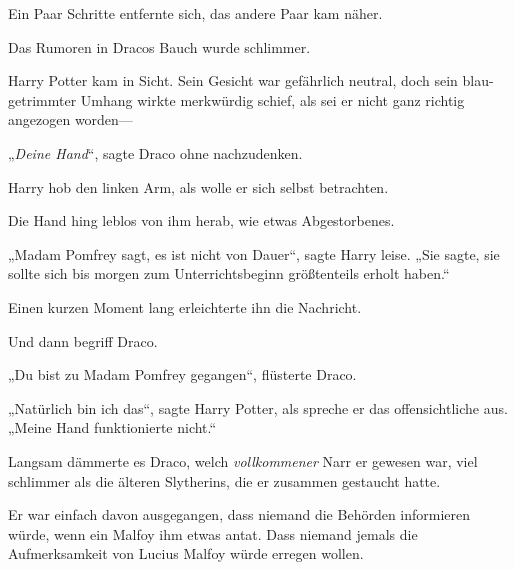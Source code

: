 Ein Paar Schritte entfernte sich, das andere Paar kam näher.

Das Rumoren in Dracos Bauch wurde schlimmer.

Harry Potter kam in Sicht. Sein Gesicht war gefährlich neutral, doch sein blau-getrimmter Umhang wirkte merkwürdig schief, als sei er nicht ganz richtig angezogen worden—

„\emph{Deine Hand}“, sagte Draco ohne nachzudenken.

Harry hob den linken Arm, als wolle er sich selbst betrachten.

Die Hand hing leblos von ihm herab, wie etwas Abgestorbenes.

„Madam Pomfrey sagt, es ist nicht von Dauer“, sagte Harry leise. „Sie sagte, sie sollte sich bis morgen zum Unterrichtsbeginn größtenteils erholt haben.“

Einen kurzen Moment lang erleichterte ihn die Nachricht.

Und dann begriff Draco.

„Du bist zu Madam Pomfrey gegangen“, flüsterte Draco.

„Natürlich bin ich das“, sagte Harry Potter, als spreche er das offensichtliche aus. „Meine Hand funktionierte nicht.“

Langsam dämmerte es Draco, welch \emph{vollkommener} Narr er gewesen war, viel schlimmer als die älteren Slytherins, die er zusammen gestaucht hatte.

Er war einfach davon ausgegangen, dass niemand die Behörden informieren würde, wenn ein Malfoy ihm etwas antat. Dass niemand jemals die Aufmerksamkeit von Lucius Malfoy würde erregen wollen.

